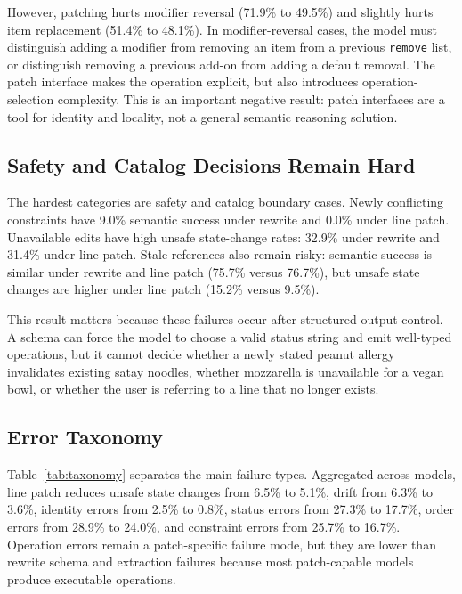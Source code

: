 \documentclass[11pt]{article}
\begin{document}
However, patching hurts modifier reversal (71.9\% to 49.5\%) and slightly
hurts item replacement (51.4\% to 48.1\%). In modifier-reversal cases,
the model must distinguish adding a modifier from removing an item from a
previous \texttt{remove} list, or distinguish removing a previous add-on from
adding a default removal. The patch interface makes the operation explicit, but
also introduces operation-selection complexity. This is an important negative
result: patch interfaces are a tool for identity and locality, not a general
semantic reasoning solution.

\begin{table}[H]
\centering
\small

\caption{Semantic success and unsafe state-change rate by category, aggregated
across the seven evaluated models.}
\label{tab:category}
\end{table}

\subsection{Safety and Catalog Decisions Remain Hard}
The hardest categories are safety and catalog boundary cases. Newly conflicting
constraints have 9.0\% semantic success under rewrite and 0.0\% under line
patch. Unavailable edits have high unsafe state-change rates: 32.9\% under
rewrite and 31.4\% under line patch. Stale references also remain risky:
semantic success is similar under rewrite and line patch (75.7\% versus
76.7\%), but unsafe state changes are higher under line patch (15.2\% versus
9.5\%).

This result matters because these failures occur after structured-output
control. A schema can force the model to choose a valid status string and emit
well-typed operations, but it cannot decide whether a newly stated peanut
allergy invalidates existing satay noodles, whether mozzarella is unavailable
for a vegan bowl, or whether the user is referring to a line that no longer
exists.

\subsection{Error Taxonomy}
Table~\ref{tab:taxonomy} separates the main failure types. Aggregated across
models, line patch reduces unsafe state changes from 6.5\% to 5.1\%, drift
from 6.3\% to 3.6\%, identity errors from 2.5\% to 0.8\%, status errors from
27.3\% to 17.7\%, order errors from 28.9\% to 24.0\%, and constraint errors
from 25.7\% to 16.7\%. Operation errors remain a patch-specific failure mode,
but they are lower than rewrite schema and extraction failures because most
patch-capable models produce executable operations.
\end{document}
